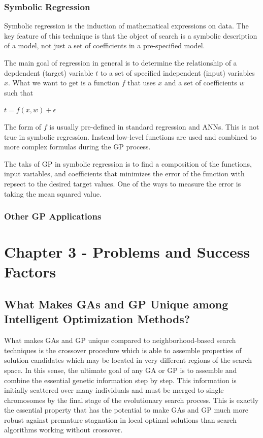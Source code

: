 \documentclass[12pt]{article}
\begin{document}
\subsubsection{Symbolic Regression}
Symbolic regression is the induction of mathematical expressions on data. The key feature of this technique is that the object of search is a symbolic description of a model, not just a set of coefficients in a pre-specified model.

The main goal of regression in general is to determine the relationship of a depdendent (target) variable $t$ to a set of specified independent (input) variables $x$. What we want to get is a function $f$ that uses $x$ and a set of coefficients $w$ such that
\begin{center}
$t = f(x,w) + \epsilon$
\end{center}
The form of $f$ is usually pre-defined in standard regression and ANNs. This is not true in symbolic regression. Instead low-level functions are used and combined to more complex formulas during the GP process.

The taks of GP in symbolic regression is to find a composition of the functions, input variables, and coefficients that minimizes the error of the function with repsect to the desired target values. One of the ways to measure the error is taking the mean squared value.
\subsubsection{Other GP Applications}
\clearpage
\section{Chapter 3 - Problems and Success Factors}
\subsection{What Makes GAs and GP Unique among Intelligent Optimization Methods?}
What makes GAs and GP unique compared to neighborhood-based search techniques is the crossover procedure which is able to assemble properties of solution candidates which may be located in very different regions of the search space. In this sense, the ultimate goal of any GA or GP is to assemble and combine the essential genetic information step by step. This information is initially scattered over many individuals and must be merged to single chromosomes by the final stage of the evolutionary search process. This is exactly the essential property that has the potential to make GAs and GP much more robust against premature stagnation in local optimal solutions than search algorithms working without crossover.
\end{document}
